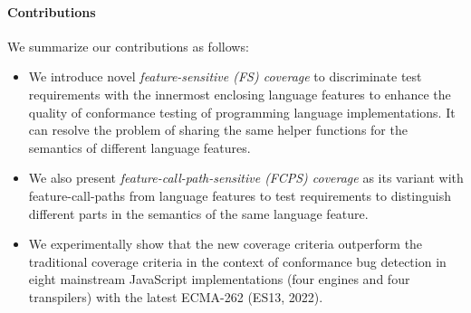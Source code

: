 \paragraph{\textbf{Contributions}}
We summarize our contributions as follows:
\begin{itemize}
  \item
    We introduce novel \textit{feature-sensitive (FS) coverage} to discriminate
    test requirements with the innermost enclosing language features to enhance
    the quality of conformance testing of programming language implementations.
    It can resolve the problem of sharing the same helper
    functions for the semantics of different language features.
  \item 
    We also present \textit{feature-call-path-sensitive (FCPS) coverage} as its
    variant with feature-call-paths from language features to test requirements
    to distinguish different parts in the semantics of the same language feature.
  \item
    We experimentally show that the new coverage criteria outperform
    the traditional coverage criteria in the
    context of conformance bug detection in eight mainstream
    JavaScript implementations (four engines and four transpilers) with the latest ECMA-262
    (ES13, 2022).
\end{itemize}
